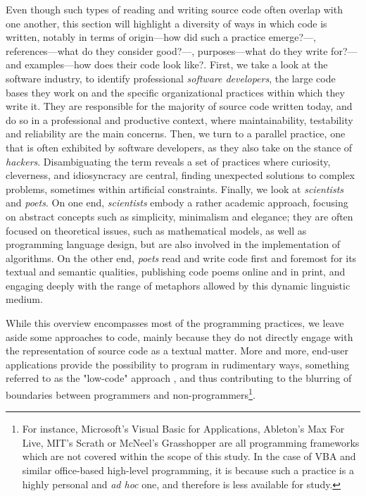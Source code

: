 Even though such types of reading and writing source code often overlap with one another, this section will highlight a diversity of  ways in which code is written, notably in terms of origin—how did such a practice emerge?—, references—what do they consider good?—, purposes—what do they write for?—and examples—how does their code look like?. First, we take a look at the software industry, to identify professional \emph{software developers}, the large code bases they work on and the specific organizational practices within which they write it. They are responsible for the majority of source code written today, and do so in a professional and productive context, where maintainability, testability and reliability are the main concerns. Then, we turn to a parallel practice, one that is often exhibited by software developers, as they also take on the stance of \emph{hackers}. Disambiguating the term reveals a set of practices where curiosity, cleverness, and idiosyncracy are central, finding unexpected solutions to complex problems, sometimes within artificial constraints. Finally, we look at \emph{scientists} and \emph{poets}. On one end, \emph{scientists} embody a rather academic approach,  focusing on abstract concepts such as simplicity, minimalism and elegance; they are often focused on theoretical issues, such as mathematical models, as well as programming language design, but are also involved in the implementation of algorithms. On the other end, \emph{poets} read and write code first and foremost for its textual and semantic qualities, publishing code poems online and in print, and engaging deeply with the range of metaphors allowed by this dynamic linguistic medium.

While this overview encompasses most of the programming practices, we leave aside some approaches to code, mainly because they do not directly engage with the representation of source code as a textual matter. More and more, end-user applications provide the possibility to program in rudimentary ways, something referred to as the "low-code" approach \citep{team_lowcode_2021}, and thus contributing to the blurring of boundaries between programmers and non-programmers\footnote{For instance, Microsoft's Visual Basic for Applications, Ableton's Max For Live, MIT's Scrath or McNeel's Grasshopper are all programming frameworks which are not covered within the scope of this study. In the case of VBA and similar office-based high-level programming, it is because such a practice is a highly personal and \emph{ad hoc} one, and therefore is less available for study.}.


